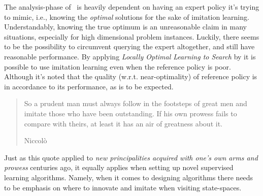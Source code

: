 The analysis-phase of \Alice\ is heavily dependent on having an expert 
policy it's trying to mimic, i.e., knowing the \emph{optimal} solutions for the 
sake of imitation learning. 
Understandably, knowing the true optimum is an unreasonable claim in many 
situations, especially for high dimensional problem instances. 
Luckily, there seems to be the possibility to circumvent querying the expert 
altogether, and still have reasonable performance. 
By applying \emph{Locally Optimal Learning to Search} by \citet{ChangKADL15} it 
is possible to use imitation learning even when the reference policy is poor. 
Although it's noted that the quality (w.r.t. near-optimality) of reference 
policy is in accordance to its performance, as is to be expected. 

\begin{quote}
    So a prudent man must always follow in the footsteps of great men and 
    imitate those who have been outstanding. If his own prowess fails to 
    compare with theirs, at least it has an air of greatness about it. 
    
    \raggedleft Niccolò \cite{Maachiavelli}
\end{quote}
Just as this quote applied to \emph{new principalities acquired with one's own 
    arms and prowess} centuries ago, it equally applies when setting up novel 
supervised learning algorithms. 
Namely, when it comes to designing algorithms there needs to be emphasis on 
where to innovate and imitate when visiting state-spaces. 
\vfill
\vfill